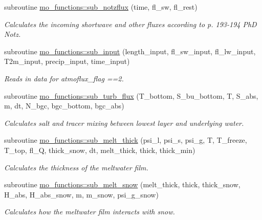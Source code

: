 \begin{DoxyCompactItemize}
subroutine \hyperlink{namespacemo__functions_a3c7420d9fae7442aeb1407179e971c35}{mo\_\-functions::sub\_\-notzflux} (time, fl\_\-sw, fl\_\-rest)
\begin{DoxyCompactList}\small\item\em Calculates the incoming shortwave and other fluxes according to p. 193-\/194 PhD Notz. \item\end{DoxyCompactList}\item 
subroutine \hyperlink{namespacemo__functions_afbb9a7012e709e4b2b6f402a9831159e}{mo\_\-functions::sub\_\-input} (length\_\-input, fl\_\-sw\_\-input, fl\_\-lw\_\-input, T2m\_\-input, precip\_\-input, time\_\-input)
\begin{DoxyCompactList}\small\item\em Reads in data for atmoflux\_\-flag ==2. \item\end{DoxyCompactList}\item 
subroutine \hyperlink{namespacemo__functions_aea674291e55cedde9a5ec71e45e92dc8}{mo\_\-functions::sub\_\-turb\_\-flux} (T\_\-bottom, S\_\-bu\_\-bottom, T, S\_\-abs, m, dt, N\_\-bgc, bgc\_\-bottom, bgc\_\-abs)
\begin{DoxyCompactList}\small\item\em Calculates salt and tracer mixing between lowest layer and underlying water. \item\end{DoxyCompactList}\item 
subroutine \hyperlink{namespacemo__functions_a463f28035b07b28bba73b8a1100b848a}{mo\_\-functions::sub\_\-melt\_\-thick} (psi\_\-l, psi\_\-s, psi\_\-g, T, T\_\-freeze, T\_\-top, fl\_\-Q, thick\_\-snow, dt, melt\_\-thick, thick, thick\_\-min)
\begin{DoxyCompactList}\small\item\em Calculates the thickness of the meltwater film. \item\end{DoxyCompactList}\item 
subroutine \hyperlink{namespacemo__functions_ad19818302426c2848ed285986cf1430d}{mo\_\-functions::sub\_\-melt\_\-snow} (melt\_\-thick, thick, thick\_\-snow, H\_\-abs, H\_\-abs\_\-snow, m, m\_\-snow, psi\_\-g\_\-snow)
\begin{DoxyCompactList}\small\item\em Calculates how the meltwater film interacts with snow. \item\end{DoxyCompactList}\end{DoxyCompactItemize}
